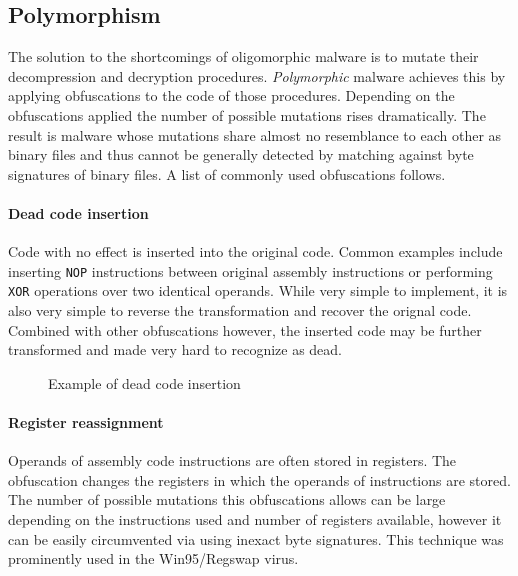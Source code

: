 \subsection{Polymorphism}
The solution to the shortcomings of oligomorphic malware is to mutate their decompression and decryption procedures. \emph{Polymorphic} malware achieves this by applying obfuscations to the code of those procedures. Depending on the obfuscations applied the number of possible mutations rises dramatically. The result is malware whose mutations share almost no resemblance to each other as binary files and thus cannot be generally detected by matching against byte signatures of binary files. A list of commonly used obfuscations follows.

\paragraph*{Dead code insertion}
Code with no effect is inserted into the original code. Common examples include inserting \texttt{NOP} instructions between original assembly instructions or performing \texttt{XOR} operations over two identical operands. While very simple to implement, it is also very simple to reverse the transformation and recover the orignal code. Combined with other obfuscations however, the inserted code may be further transformed and made very hard to recognize as dead.

\begin{figure}[H]
    \centering
    \caption{Example of dead code insertion}
    \label{fig_obf_dci}
\end{figure}

\paragraph*{Register reassignment}
Operands of assembly code instructions are often stored in registers. The obfuscation changes the registers in which the operands of instructions are stored. The number of possible mutations this obfuscations allows can be large depending on the instructions used and number of registers available, however it can be easily circumvented via using inexact byte signatures. This technique was prominently used in the Win95/Regswap virus.

